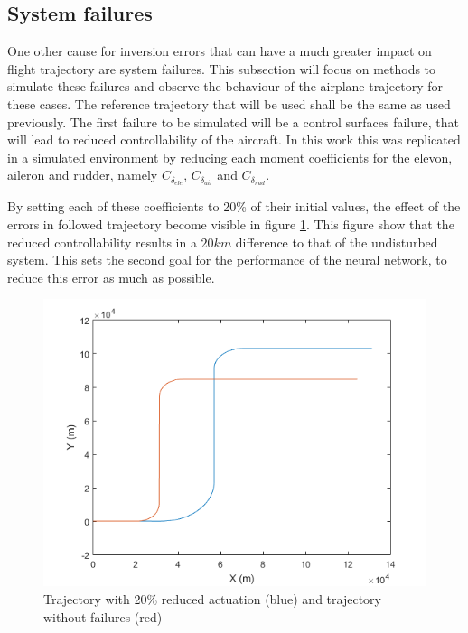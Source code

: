 \subsection{System failures}

One other cause for inversion errors that can have a much greater impact on flight trajectory are system failures. This subsection will focus on methods to simulate these failures and observe the behaviour of the airplane trajectory for these cases. The reference trajectory that will be used shall be the same as used previously. The first failure to be simulated will be a control surfaces failure, that will lead to reduced controllability of the aircraft. In this work this was replicated in a simulated environment by reducing each moment coefficients for the elevon, aileron and rudder, namely $C_{\delta_{ele}}$, $C_{\delta_{ail}}$ and $C_{\delta_{rud}}$.

By setting each of these coefficients to 20\% of their initial values, the effect of the errors in followed trajectory become visible in figure \ref{fig:reduced_act}. This figure show that the reduced controllability results in a $20km$ difference to that of the undisturbed system. This sets the second goal for the performance of the neural network, to reduce this error as much as possible.

\begin{figure}[H]
\centering
\includegraphics[width=\textwidth]{Figures/Results/reduced_act.png}
\caption[Trajectory with reduced actuation]{Trajectory with 20\% reduced actuation (blue) and trajectory without failures (red)}
\label{fig:reduced_act}
\end{figure}

